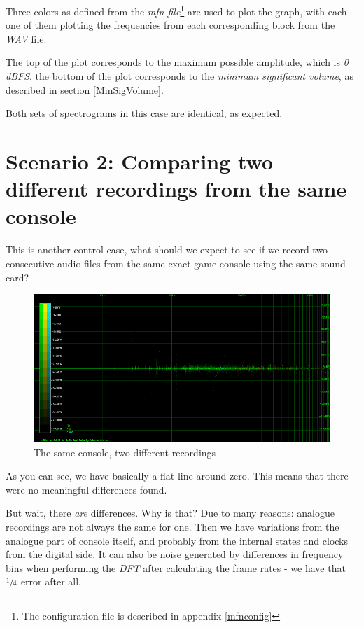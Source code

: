\documentclass[10pt,a4paper]{report}
\begin{document}
Three colors as defined from the \textit{mfn file}\footnote{The configuration file is described in appendix \ref{mfnconfig}} are used to plot the graph, with each one of them plotting the frequencies from each corresponding block from the \textit{WAV} file.

The top of the plot corresponds to the maximum possible amplitude, which is \textit{0 dBFS}. the bottom of the plot corresponds to the \textit{minimum significant volume}, as described in section \ref{MinSigVolume}.

Both sets of spectrograms in this case are identical, as expected. 

\section{Scenario 2: Comparing two different recordings from the same console}

This is another control case, what should we expect to see if we record two consecutive audio files from the same exact game console using the same sound card?

\begin{figure}[H]
	\centering
	\includegraphics[width=1\linewidth]{images/interpretation/Plot2-Sameconsole.png}
	\caption[Same console compared]{The same console, two different recordings}
	\label{fig:plot2-sameconsole}
\end{figure}

As you can see, we have basically a flat line around zero. This means that there were no meaningful differences found. 

But wait, there \textit{are} differences. Why is that? Due to many reasons: analogue recordings are not always the same for one. Then we have variations from the analogue part of console itself, and probably from the internal states and clocks from the digital side. It can also be noise generated by differences in frequency bins when performing the \textit{DFT} after calculating the frame rates - we have that $\sfrac{1}{4}$ error after all.
\end{document}
